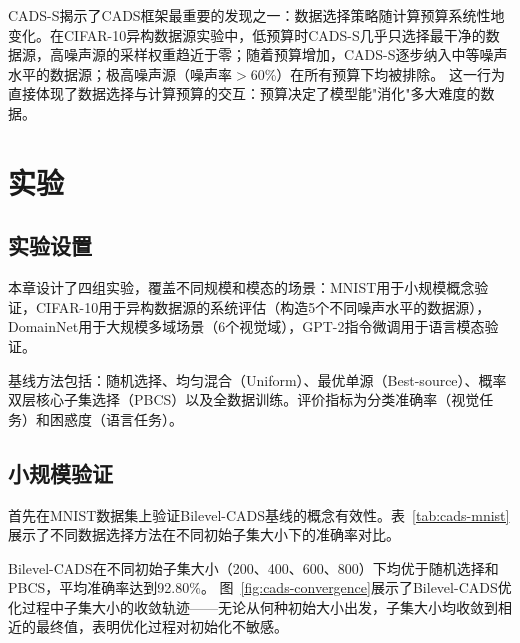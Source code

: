 CADS-S揭示了CADS框架最重要的发现之一：数据选择策略随计算预算系统性地变化。在CIFAR-10异构数据源实验中，低预算时CADS-S几乎只选择最干净的数据源，高噪声源的采样权重趋近于零；随着预算增加，CADS-S逐步纳入中等噪声水平的数据源；极高噪声源（噪声率$>$60\%）在所有预算下均被排除。%
这一行为直接体现了数据选择与计算预算的交互：预算决定了模型能"消化"多大难度的数据。


\section{实验}

\subsection{实验设置}

本章设计了四组实验，覆盖不同规模和模态的场景：MNIST\cite{lecun1998mnist}用于小规模概念验证，CIFAR-10\cite{krizhevsky2009cifar}用于异构数据源的系统评估（构造5个不同噪声水平的数据源），DomainNet\cite{domainnet}用于大规模多域场景（6个视觉域），GPT-2\cite{radford2019language}指令微调用于语言模态验证。%

基线方法包括：随机选择、均匀混合（Uniform）、最优单源（Best-source）、概率双层核心子集选择（PBCS\cite{zhou2022probabilistic}）以及全数据训练。评价指标为分类准确率（视觉任务）和困惑度（语言任务）。

\subsection{小规模验证}

首先在MNIST数据集上验证Bilevel-CADS基线的概念有效性。表~\ref{tab:cads-mnist}展示了不同数据选择方法在不同初始子集大小下的准确率对比。

\begin{table}[htb]
  \centering
  \caption{MNIST上不同数据选择方法在不同初始子集大小下的准确率对比}
  \label{tab:cads-mnist}
\end{table}

Bilevel-CADS在不同初始子集大小（200、400、600、800）下均优于随机选择和PBCS，平均准确率达到92.80\%。%
图~\ref{fig:cads-convergence}展示了Bilevel-CADS优化过程中子集大小的收敛轨迹——无论从何种初始大小出发，子集大小均收敛到相近的最终值，表明优化过程对初始化不敏感。

